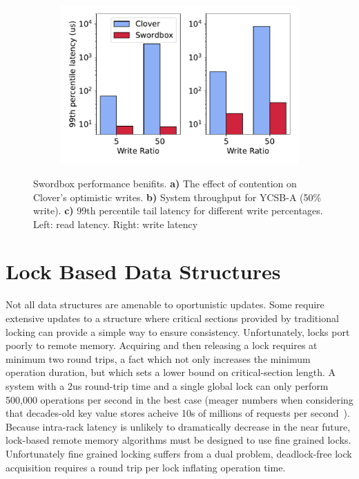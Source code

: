 \begin{figure}[t!]
\begin{subfigure}{.33\textwidth}
      \centering
      \includegraphics[width=.9\linewidth]{fig/99th_latency.pdf}
    \end{subfigure}

    \caption{Swordbox performance benifits. \textbf{a)} The effect of contention on
    Clover's optimistic writes. \textbf{b)} System throughput
    for YCSB-A (50\% write). \textbf{c)} 99th percentile tail
    latency for different write percentages. Left: read
    latency. Right: write latency}
        
    \label{fig:swordbox}
\end{figure}

\section{Lock Based Data Structures}

Not all data structures are amenable to oportunistic
updates. Some require extensive updates to a structure where
critical sections provided by traditional locking can
provide a simple way to ensure consistency. Unfortunately,
locks port poorly to remote memory. 
Acquiring and then releasing a lock requires at minimum two
round trips, a fact which not only increases the minimum
operation duration, but which sets a lower bound on
critical-section length. A system with a 2us round-trip time
and a single global lock can only perform 500,000 operations
per second in the best case (meager numbers when considering
that decades-old key value stores acheive 10s of millions of
requests per second~\cite{herd}). Because intra-rack latency
is unlikely to dramatically decrease in the near future,
lock-based remote memory algorithms must be designed to use
fine grained locks. Unfortunately fine grained locking
suffers from a dual problem, deadlock-free lock acquisition
requires a round trip per lock inflating operation time. 

